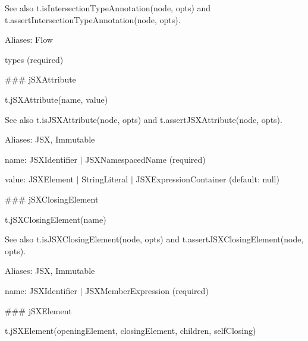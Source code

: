 See also {\ttfamily t.\+is\+Intersection\+Type\+Annotation(node, opts)} and {\ttfamily t.\+assert\+Intersection\+Type\+Annotation(node, opts)}.

Aliases\+: {\ttfamily Flow}


\begin{DoxyItemize}
\item {\ttfamily types} (required) 


\end{DoxyItemize}

\#\#\# j\+S\+X\+Attribute 
\begin{DoxyCode}
t.jSXAttribute(name, value)
\end{DoxyCode}


See also {\ttfamily t.\+is\+J\+S\+X\+Attribute(node, opts)} and {\ttfamily t.\+assert\+J\+S\+X\+Attribute(node, opts)}.

Aliases\+: {\ttfamily J\+SX}, {\ttfamily Immutable}


\begin{DoxyItemize}
\item {\ttfamily name}\+: {\ttfamily J\+S\+X\+Identifier $\vert$ J\+S\+X\+Namespaced\+Name} (required)
\item {\ttfamily value}\+: {\ttfamily J\+S\+X\+Element $\vert$ String\+Literal $\vert$ J\+S\+X\+Expression\+Container} (default\+: {\ttfamily null}) 


\end{DoxyItemize}

\#\#\# j\+S\+X\+Closing\+Element 
\begin{DoxyCode}
t.jSXClosingElement(name)
\end{DoxyCode}


See also {\ttfamily t.\+is\+J\+S\+X\+Closing\+Element(node, opts)} and {\ttfamily t.\+assert\+J\+S\+X\+Closing\+Element(node, opts)}.

Aliases\+: {\ttfamily J\+SX}, {\ttfamily Immutable}


\begin{DoxyItemize}
\item {\ttfamily name}\+: {\ttfamily J\+S\+X\+Identifier $\vert$ J\+S\+X\+Member\+Expression} (required) 


\end{DoxyItemize}

\#\#\# j\+S\+X\+Element 
\begin{DoxyCode}
t.jSXElement(openingElement, closingElement, children, selfClosing)
\end{DoxyCode}


